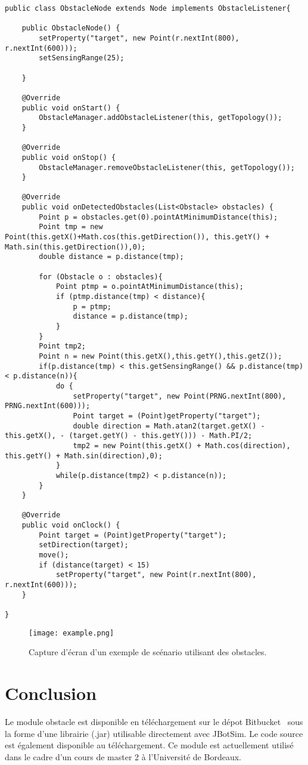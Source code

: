 \documentclass{article}
\begin{document}
\begin{lstlisting}[frame=shadowbox,captionpos=b,caption={Classe ObstacleNode},abovecaptionskip=2ex,label={obstaclenode}]
public class ObstacleNode extends Node implements ObstacleListener{

    public ObstacleNode() {
        setProperty("target", new Point(r.nextInt(800), r.nextInt(600)));
        setSensingRange(25);

    }

    @Override
    public void onStart() {
        ObstacleManager.addObstacleListener(this, getTopology());
    }

    @Override
    public void onStop() {
        ObstacleManager.removeObstacleListener(this, getTopology());
    }

    @Override
    public void onDetectedObstacles(List<Obstacle> obstacles) {
        Point p = obstacles.get(0).pointAtMinimumDistance(this);
        Point tmp = new Point(this.getX()+Math.cos(this.getDirection()), this.getY() + Math.sin(this.getDirection()),0);
        double distance = p.distance(tmp);

        for (Obstacle o : obstacles){
            Point ptmp = o.pointAtMinimumDistance(this);
            if (ptmp.distance(tmp) < distance){
                p = ptmp;
                distance = p.distance(tmp);
            }
        }
        Point tmp2;
        Point n = new Point(this.getX(),this.getY(),this.getZ());
        if(p.distance(tmp) < this.getSensingRange() && p.distance(tmp) < p.distance(n)){
            do {
                setProperty("target", new Point(PRNG.nextInt(800), PRNG.nextInt(600)));
                Point target = (Point)getProperty("target");
                double direction = Math.atan2(target.getX() - this.getX(), - (target.getY() - this.getY())) - Math.PI/2;
                tmp2 = new Point(this.getX() + Math.cos(direction), this.getY() + Math.sin(direction),0);
            }
            while(p.distance(tmp2) < p.distance(n));
        }
    }

    @Override
    public void onClock() {
        Point target = (Point)getProperty("target");
        setDirection(target);
        move();
        if (distance(target) < 15)
            setProperty("target", new Point(r.nextInt(800), r.nextInt(600)));
    }

}
\end{lstlisting}

\begin{figure}[h]
\centering
\texttt{[image: example.png]}
\caption{Capture d'écran d'un exemple de scénario utilisant des obstacles.}
\label{obstacle:fig:exemple}
\end{figure}

\section{Conclusion}
Le module obstacle est disponible en téléchargement sur le dépot Bitbucket~\cite{obstacle} sous la forme d'une librairie (.jar) utilisable directement avec JBotSim. Le code source est également disponible au téléchargement. Ce module est actuellement utilisé dans le cadre d'un cours de master 2 à l'Université de Bordeaux.



\end{document}
